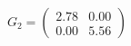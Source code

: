 \documentclass[preview]{standalone}
\begin{document}
\begin{align*}
G_2 = \begin{pmatrix} 2.78 & 0.00 \\ 0.00 & 5.56 \end{pmatrix}
\end{align*}
\end{document}
